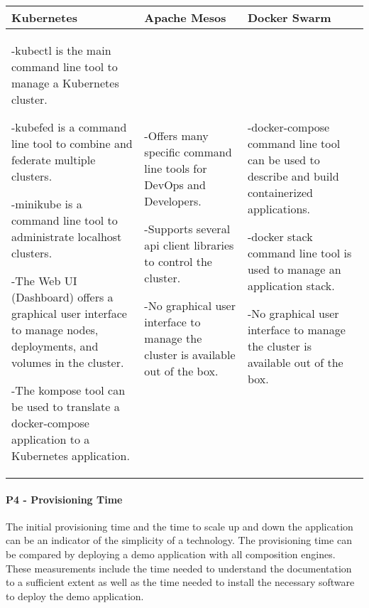 \begin{center}
  \begin{tabular}{ | p{4.5cm} | p{4.5cm} | p{4.5cm} | }
  	\hline
    \textbf{Kubernetes}&\textbf{Apache Mesos}&\textbf{Docker Swarm}\\\hline
    -kubectl is the main command line tool to manage a Kubernetes cluster.
    
    -kubefed is a command line tool to combine and federate multiple
    clusters.

	-minikube is a command line tool to administrate localhost clusters.
    
    -The Web UI (Dashboard) offers a graphical user interface to manage nodes,
    deployments, and volumes in the cluster.
    
    -The kompose tool can be used to translate a docker-compose application to
    a Kubernetes application. &
    
    -Offers many specific command line tools for DevOps and Developers.
    
    -Supports several \gls{api} client libraries to control the cluster.
    
    -No graphical user interface to manage the cluster is available out of the
    box. &
    
    -docker-compose command line tool  can be used to describe and build
    containerized applications.
    
    -docker stack command line tool is used to manage an application stack.
    
    -No graphical user interface to manage the cluster is available out of the
    box.\\
    
    \hline
  \end{tabular}
\end{center}

\paragraph{P4 - Provisioning Time}

The initial provisioning time and the time to scale up and down the application
can be an indicator of the simplicity of a technology. The provisioning time can
be compared by deploying a demo application with all composition engines.
These measurements include the time needed to understand the documentation to a
sufficient extent as well as the time needed to install the necessary software
to deploy the demo application.

